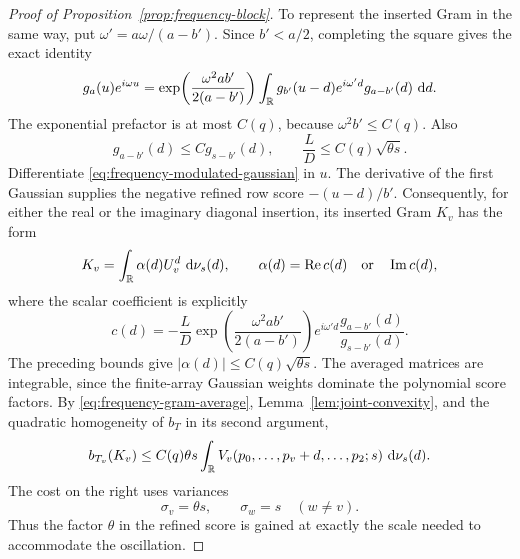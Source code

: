 \begin{proof}[Proof of Proposition~\ref{prop:frequency-block}]
To represent the inserted Gram in the same way, put
$\omega'=a\omega/(a-b')$.  Since $b'<a/2$, completing the square
gives the exact identity
\begin{equation}\label{eq:frequency-modulated-gaussian}
 g_a(u)e^{i\omega u}
 =\exp\!\left(\frac{\omega^2ab'}{2(a-b')}\right)
       \int_{\mathbb R}g_{b'}(u-d)e^{i\omega'd}g_{a-b'}(d)\,\,\mathrm d d.
\end{equation}
The exponential prefactor is at most $C(q)$, because
$\omega^2b'\leq C(q)$.  Also
\[
 g_{a-b'}(d)\leq Cg_{s-b'}(d),\qquad
 \frac LD\leq C(q)\sqrt{\theta s}.
\]
Differentiate \eqref{eq:frequency-modulated-gaussian} in $u$.
The derivative of the first Gaussian supplies the negative refined
row score $-(u-d)/b'$.  Consequently, for either the real or the
imaginary diagonal insertion, its inserted Gram $K_v$ has the form
\[
 K_v=\int_{\mathbb R}\alpha(d)U_v^d\,\,\mathrm d\nu_s(d),
 \qquad \alpha(d)=\operatorname{Re}c(d)
       \quad\hbox{or}\quad\operatorname{Im}c(d),
\]
where the scalar coefficient is explicitly
\[
 c(d)=-\frac LD
       \exp\!\left(\frac{\omega^2ab'}{2(a-b')}\right)
       e^{i\omega'd}\frac{g_{a-b'}(d)}{g_{s-b'}(d)}.
\]
The preceding bounds give
$|\alpha(d)|\leq C(q)\sqrt{\theta s}$.
The averaged matrices are integrable, since the finite-array Gaussian
weights dominate the polynomial score factors.  By
\eqref{eq:frequency-gram-average},
Lemma~\ref{lem:joint-convexity}, and the quadratic homogeneity of
$b_T$ in its second argument,
\begin{equation}\label{eq:frequency-score-refinement}
 b_{T_v}(K_v)
 \leq C(q)\theta s\int_{\mathbb R}
           V_v(p_0,\ldots,p_v+d,\ldots,p_2;s)\,\,\mathrm d\nu_s(d).
\end{equation}
The cost on the right uses variances
\begin{equation}\label{eq:frequency-anisotropic-variances}
 \sigma_v=\theta s,\qquad \sigma_w=s\quad(w\ne v).
\end{equation}
Thus the factor $\theta$ in the refined score is gained at exactly
the scale needed to accommodate the oscillation.


\end{proof}
